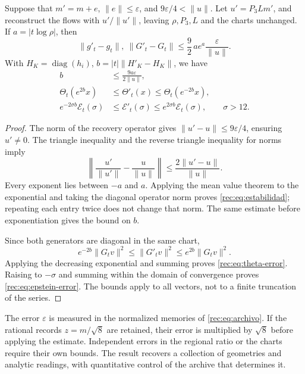 \begin{theorem}
\label{rec:thm:estabilidad}
Suppose that \(m'=m+e\), \(\|e\|\le\varepsilon\), and \(9\varepsilon/4<\|u\|\). Let \(u'=P_3Lm'\), and reconstruct the flows with \(u'/\|u'\|\), leaving \(\rho,P_3,L\) and the charts unchanged. If \(a=|t\log\rho|\), then
\begin{equation}
 \|g'_t-g_t\|,\ \|G'_t-G_t\|
 \le\frac92\,a e^a\frac{\varepsilon}{\|u\|}.
 \label{rec:eq:estabilidad}
\end{equation}
With \(H_K=\operatorname{diag}(h_i)\), \(b=|t|\|H'_K-H_K\|\), we have
\begin{align}
 b&\le\frac{9a\varepsilon}{2\|u\|},\nonumber\\
 \Theta_t(e^{2b}x)&\le\Theta'_t(x)\le\Theta_t(e^{-2b}x),\label{rec:eq:theta-error}\\
 e^{-2\sigma b}\mathcal E_t(\sigma)&\le\mathcal E'_t(\sigma)
             \le e^{2\sigma b}\mathcal E_t(\sigma),\qquad\sigma>12.
 \label{rec:eq:epstein-error}
\end{align}
\end{theorem}
\begin{proof}
The norm of the recovery operator gives \(\|u'-u\|\le9\varepsilon/4\), ensuring \(u'\ne0\). The triangle inequality and the reverse triangle inequality for norms imply
\[
 \left\|\frac{u'}{\|u'\|}-\frac{u}{\|u\|}\right\|
 \le\frac{2\|u'-u\|}{\|u\|}.
\]
Every exponent lies between \(-a\) and \(a\). Applying the mean value theorem to the exponential and taking the diagonal operator norm proves \eqref{rec:eq:estabilidad}; repeating each entry twice does not change that norm. The same estimate before exponentiation gives the bound on \(b\).

Since both generators are diagonal in the same chart,
\[
 e^{-2b}\|G_tv\|^2\le\|G'_tv\|^2\le e^{2b}\|G_tv\|^2.
\]
Applying the decreasing exponential and summing proves \eqref{rec:eq:theta-error}. Raising to \(-\sigma\) and summing within the domain of convergence proves \eqref{rec:eq:epstein-error}. The bounds apply to all vectors, not to a finite truncation of the series.
\end{proof}

The error \(\varepsilon\) is measured in the normalized memories of \eqref{rec:eq:archivo}. If the rational records \(z=m/\sqrt8\) are retained, their error is multiplied by \(\sqrt8\) before applying the estimate. Independent errors in the regional ratio or the charts require their own bounds. The result recovers a collection of geometries and analytic readings, with quantitative control of the archive that determines it.

